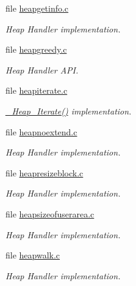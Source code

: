 \begin{DoxyCompactItemize}
file \mbox{\hyperlink{heapgetinfo_8c}{heapgetinfo.\+c}}
\begin{DoxyCompactList}\small\item\em Heap Handler implementation. \end{DoxyCompactList}\item 
file \mbox{\hyperlink{heapgreedy_8c}{heapgreedy.\+c}}
\begin{DoxyCompactList}\small\item\em Heap Handler A\+PI. \end{DoxyCompactList}\item 
file \mbox{\hyperlink{heapiterate_8c}{heapiterate.\+c}}
\begin{DoxyCompactList}\small\item\em \mbox{\hyperlink{group__RTEMSScoreHeap_ga568d8a3b62e8b4b060940770bdeee254}{\+\_\+\+Heap\+\_\+\+Iterate()}} implementation. \end{DoxyCompactList}\item 
file \mbox{\hyperlink{heapnoextend_8c}{heapnoextend.\+c}}
\begin{DoxyCompactList}\small\item\em Heap Handler implementation. \end{DoxyCompactList}\item 
file \mbox{\hyperlink{heapresizeblock_8c}{heapresizeblock.\+c}}
\begin{DoxyCompactList}\small\item\em Heap Handler implementation. \end{DoxyCompactList}\item 
file \mbox{\hyperlink{heapsizeofuserarea_8c}{heapsizeofuserarea.\+c}}
\begin{DoxyCompactList}\small\item\em Heap Handler implementation. \end{DoxyCompactList}\item 
file \mbox{\hyperlink{heapwalk_8c}{heapwalk.\+c}}
\begin{DoxyCompactList}\small\item\em Heap Handler implementation. \end{DoxyCompactList}\end{DoxyCompactItemize}
